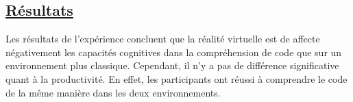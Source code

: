 \documentclass[a4paper,10pt, oneside]{article}
\begin{document}
\subsection{\ul{Résultats}}
		\par Les résultats de l'expérience concluent que la réalité virtuelle est de affecte négativement les capacités cognitives dans la compréhension de code que sur un environnement plus classique.
		Cependant, il n'y a pas de différence significative quant à la productivité. En effet, les participants ont réussi à comprendre le code de la même manière dans les deux environnements.
\newpage

 
\end{document}
